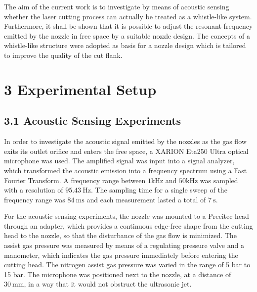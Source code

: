 \documentclass[10pt]{article}
\begin{document}
The aim of the current work is to investigate by means of acoustic sensing whether the laser cutting process can actually be treated as a whistle-like system. Furthermore, it shall be shown that it is possible to adjust the resonant frequency emitted by the nozzle in free space by a suitable nozzle design. The concepts of a whistle-like structure were adopted as basis for a nozzle design which is tailored to improve the quality of the cut flank.

\section*{3 Experimental Setup}
\subsection*{3.1 Acoustic Sensing Experiments}
In order to investigate the acoustic signal emitted by the nozzles as the gas flow exits its outlet orifice and enters the free space, a XARION Eta250 Ultra optical microphone was used. The amplified signal was input into a signal analyzer, which transformed the acoustic emission into a frequency spectrum using a Fast Fourier Transform. A frequency range between $1 \mathrm{kHz}$ and $50 \mathrm{kHz}$ was sampled with a resolution of $95.43 \mathrm{~Hz}$. The sampling time for a single sweep of the frequency range was $84 \mathrm{~ms}$ and each measurement lasted a total of $7 \mathrm{~s}$.

For the acoustic sensing experiments, the nozzle was mounted to a Precitec head through an adapter, which provides a continuous edge-free shape from the cutting head to the nozzle, so that the disturbance of the gas flow is minimized. The assist gas pressure was measured by means of a regulating pressure valve and a manometer, which indicates the gas pressure immediately before entering the cutting head. The nitrogen assist gas pressure was varied in the range of 5 bar to 15 bar. The microphone was positioned next to the nozzle, at a distance of $30 \mathrm{~mm}$, in a way that it would not obstruct the ultrasonic jet.
\end{document}
